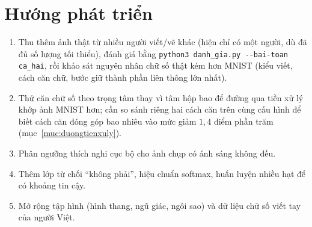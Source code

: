 \section{Hướng phát triển}
\label{muc:huongphattrien}
\begin{enumerate}
\item Thu thêm ảnh thật từ nhiều người viết/vẽ khác (hiện chỉ có một người, dù đã đủ số lượng tối thiểu), đánh giá bằng \texttt{python3 danh\_gia.py -{}-bai-toan ca\_hai}, rồi khảo sát nguyên nhân chữ số thật kém hơn MNIST (kiểu viết, cách căn chữ, bước giữ thành phần liên thông lớn nhất).
\item Thử căn chữ số theo trọng tâm thay vì tâm hộp bao để đường qua tiền xử lý khớp ảnh MNIST hơn; cần so sánh riêng hai cách căn trên cùng cấu hình để biết cách căn đóng góp bao nhiêu vào mức giảm $1{,}4$ điểm phần trăm (mục~\ref{muc:duongtienxuly}).
\item Phân ngưỡng thích nghi cục bộ cho ảnh chụp có ánh sáng không đều.
\item Thêm lớp từ chối ``không phải'', hiệu chuẩn softmax, huấn luyện nhiều hạt để có khoảng tin cậy.
\item Mở rộng tập hình (hình thang, ngũ giác, ngôi sao) và dữ liệu chữ số viết tay của người Việt.
\end{enumerate}
